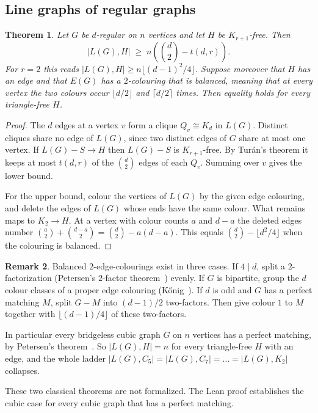 \documentclass{article}
\newtheorem{theorem}{Theorem}[section]
\theoremstyle{definition}
\newtheorem{remark}[theorem]{Remark}
\begin{document}
\subsection{Line graphs of regular graphs}

\begin{theorem}
\label{thm:line}
Let $G$ be $d$-regular on $n$ vertices and let $H$ be $K_{r+1}$-free.  Then
\[
  |L(G),H|\;\ge\; n\left(\binom d2-t(d,r)\right).
\]
For $r=2$ this reads $|L(G),H|\ge n\lfloor(d-1)^2/4\rfloor$.  Suppose moreover
that $H$ has an edge and that $E(G)$ has a $2$-colouring that is
\emph{balanced}, meaning that at every vertex the two colours occur
$\lfloor d/2\rfloor$ and $\lceil d/2\rceil$ times.  Then equality holds for
every triangle-free $H$.
\end{theorem}

\begin{proof}
The $d$ edges at a vertex $v$ form a clique $Q_v\cong K_d$ in $L(G)$.  Distinct
cliques share no edge of $L(G)$, since two distinct edges of $G$ share at most one
vertex.  If $L(G)-S\to H$ then $L(G)-S$ is $K_{r+1}$-free.  By Tur\'an's theorem
it keeps at most $t(d,r)$ of the $\binom d2$ edges of each $Q_v$.  Summing over
$v$ gives the lower bound.

For the upper bound, colour the vertices of $L(G)$ by the given edge colouring,
and delete the edges of $L(G)$ whose ends have the same colour.  What remains maps
to $K_2\to H$.  At a vertex with colour counts $a$ and $d-a$ the deleted edges
number $\binom a2+\binom{d-a}2=\binom d2-a(d-a)$.  This equals
$\binom d2-\lfloor d^2/4\rfloor$ when the colouring is balanced.
\end{proof}

\begin{remark}
\label{rem:balanced}
Balanced $2$-edge-colourings exist in three cases.  If $4\mid d$, split a
$2$-factorization (Petersen's $2$-factor theorem~\cite{petersen1891}) evenly.  If
$G$ is bipartite, group the $d$ colour classes of a proper edge colouring
(K\H{o}nig~\cite{konig1916}).  If $d$ is odd and $G$ has a perfect matching $M$,
split $G-M$ into $(d-1)/2$ two-factors.  Then give colour $1$ to $M$ together with
$\lfloor (d-1)/4\rfloor$ of these two-factors.

In particular every bridgeless cubic graph $G$ on $n$ vertices has a perfect
matching, by Petersen's theorem~\cite{petersen1891}.  So $|L(G),H|=n$ for every
triangle-free $H$ with an edge, and the whole ladder
$|L(G),C_5|=|L(G),C_7|=\dots=|L(G),K_2|$ collapses.

These two classical theorems are not formalized.  The Lean proof establishes the
cubic case for every cubic graph that has a perfect matching.
\end{remark}
\end{document}

